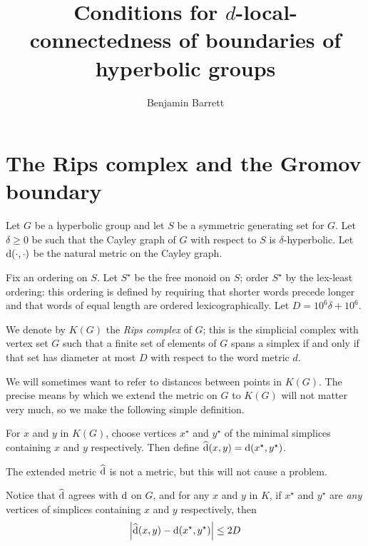 \documentclass[a4paper]{article}
\title{Conditions for $d$-local-connectedness of boundaries of hyperbolic groups}
\author{Benjamin Barrett}
\begin{document}
\maketitle

\section{The Rips complex and the Gromov boundary}\label{sec:spheres}

Let $G$ be a hyperbolic group and let $S$ be a symmetric generating set for $G$.
Let $\delta \geq 0$ be such that the Cayley graph of $G$ with respect to $S$ is 
$\delta$-hyperbolic. Let $\operatorname{d}(\cdot, \cdot)$ be the natural metric on the
Cayley graph.

Fix an ordering on $S$. Let $S^\star$ be the free monoid on 
$S$; order $S^\star$ by the lex-least ordering: this ordering is defined by 
requiring that shorter words precede longer and that words of equal length are 
ordered lexicographically. Let $D = 10^6\delta + 10^6$.

\begin{definition}
  We denote by $K(G)$ the \emph{Rips complex} of $G$; this is the simplicial
  complex with vertex set $G$ such that a finite set of elements of $G$ spans a
  simplex if and only if that set has diameter at most $D$ with respect to the
  word metric $d$.
\end{definition}

We will sometimes want to refer to distances between points in $K(G)$. The
precise means by which we extend the metric on $G$ to $K(G)$ will not matter
very much, so we make the following simple definition.

\begin{definition}
  For $x$ and $y$ in $K(G)$, choose vertices $x^\star$ and $y^\star$ of the
  minimal simplices containing $x$ and $y$ respectively. Then define
  $\operatorname{\widehat{d}}(x,y) = \operatorname{d}(x^\star, y^\star)$.
\end{definition}

\begin{remark}\label{rem:dist_vs_newdist}
  The extended metric $\operatorname{\widehat{d}}$ is not a metric, but this will not cause a
  problem.

  Notice that $\operatorname{\widehat{d}}$ agrees with $\operatorname{d}$ on $G$, and for any $x$ and $y$ in
  $K$, if $x^\star$ and $y^\star$ are \emph{any} vertices of simplices
  containing $x$ and $y$ respectively, then
  \begin{align*}
    \left|\operatorname{\widehat{d}}(x,y) - \operatorname{d}(x^\star, y^\star)\right| \leq 2D
  \end{align*}
\end{remark}
\end{document}

